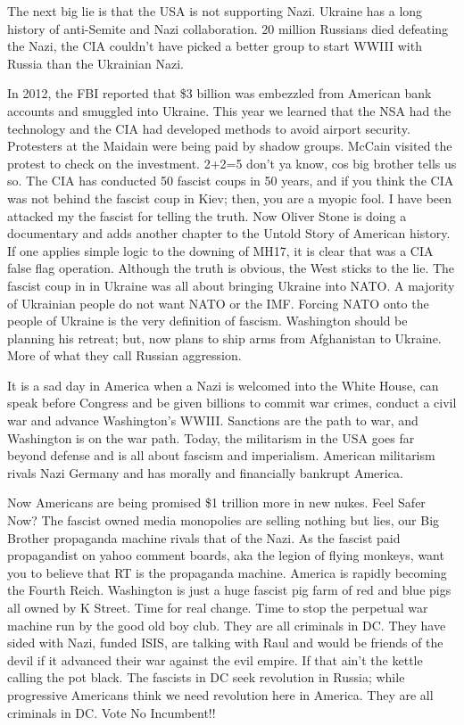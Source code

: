 \begin{itemize}
\begin{itemize}
The next big lie is that the USA is not supporting Nazi. Ukraine has a long
history of anti-Semite and Nazi collaboration. 20 million Russians died
defeating the Nazi, the CIA couldn't have picked a better group to start WWIII
with Russia than the Ukrainian Nazi. 

In 2012, the FBI reported that \$3 billion was embezzled from American bank
accounts and smuggled into Ukraine. This year we learned that the NSA had the
technology and the CIA had developed methods to avoid airport security.
Protesters at the Maidain were being paid by shadow groups. McCain visited the
protest to check on the investment. 2+2=5 don't ya know, cos big brother tells
us so. The CIA has conducted 50 fascist coups in 50 years, and if you think the
CIA was not behind the fascist coup in Kiev; then, you are a myopic fool. I
have been attacked my the fascist for telling the truth. Now Oliver Stone is
doing a documentary and adds another chapter to the Untold Story of American
history. If one applies simple logic to the downing of MH17, it is clear that
was a CIA false flag operation. Although the truth is obvious, the West sticks
to the lie. The fascist coup in in Ukraine was all about bringing Ukraine into
NATO. A majority of Ukrainian people do not want NATO or the IMF. Forcing NATO
onto the people of Ukraine is the very definition of fascism. Washington should
be planning his retreat; but, now plans to ship arms from Afghanistan to
Ukraine. More of what they call Russian aggression. 

It is a sad day in America when a Nazi is welcomed into the White House, can
speak before Congress and be given billions to commit war crimes, conduct a
civil war and advance Washington's WWIII. Sanctions are the path to war, and
Washington is on the war path. Today, the militarism in the USA goes far beyond
defense and is all about fascism and imperialism. American militarism rivals
Nazi Germany and has morally and financially bankrupt America. 

Now Americans are being promised \$1 trillion more in new nukes. Feel Safer
Now? The fascist owned media monopolies are selling nothing but lies, our Big
Brother propaganda machine rivals that of the Nazi. As the fascist paid
propagandist on yahoo comment boards, aka the legion of flying monkeys, want
you to believe that RT is the propaganda machine. America is rapidly becoming
the Fourth Reich. Washington is just a huge fascist pig farm of red and blue
pigs all owned by K Street. Time for real change. Time to stop the perpetual
war machine run by the good old boy club. They are all criminals in DC. They
have sided with Nazi, funded ISIS, are talking with Raul and would be friends
of the devil if it advanced their war against the evil empire. If that ain't
the kettle calling the pot black. The fascists in DC seek revolution in Russia;
while progressive Americans think we need revolution here in America. They are
all criminals in DC. Vote No Incumbent!!


\end{itemize}
\end{itemize}
